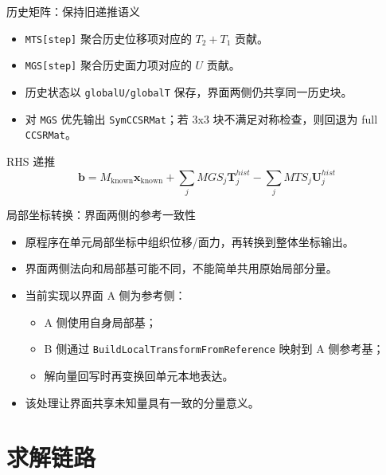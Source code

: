 \documentclass[aspectratio=169,UTF8]{ctexbeamer}
\newcommand{\code}[1]{\texttt{\small #1}}
\begin{document}
\begin{frame}{历史矩阵：保持旧递推语义}
  \begin{itemize}
    \item \code{MTS[step]} 聚合历史位移项对应的 $T_2 + T_1$ 贡献。
    \item \code{MGS[step]} 聚合历史面力项对应的 $U$ 贡献。
    \item 历史状态以 \code{globalU/globalT} 保存，界面两侧仍共享同一历史块。
    \item 对 \code{MGS} 优先输出 \code{SymCCSRMat}；若 3x3 块不满足对称检查，则回退为 full \code{CCSRMat}。
  \end{itemize}

  \begin{block}{RHS 递推}
    \[
      \mathbf{b} =
      M_{\mathrm{known}}\mathbf{x}_{\mathrm{known}}
      + \sum_j MGS_j \mathbf{T}^{hist}_j
      - \sum_j MTS_j \mathbf{U}^{hist}_j
    \]
  \end{block}
\end{frame}

\begin{frame}{局部坐标转换：界面两侧的参考一致性}
  \begin{itemize}
    \item 原程序在单元局部坐标中组织位移/面力，再转换到整体坐标输出。
    \item 界面两侧法向和局部基可能不同，不能简单共用原始局部分量。
    \item 当前实现以界面 A 侧为参考侧：
      \begin{itemize}
        \item A 侧使用自身局部基；
        \item B 侧通过 \code{BuildLocalTransformFromReference} 映射到 A 侧参考基；
        \item 解向量回写时再变换回单元本地表达。
      \end{itemize}
    \item 该处理让界面共享未知量具有一致的分量意义。
  \end{itemize}
\end{frame}

\section{求解链路}
\end{document}
